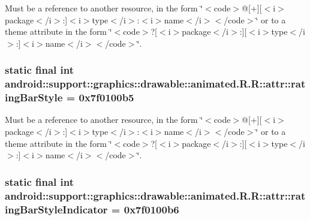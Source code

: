 Must be a reference to another resource, in the form \char`\"{}$<$code$>$@\mbox{[}+\mbox{]}\mbox{[}$<$i$>$package$<$/i$>$:\mbox{]}$<$i$>$type$<$/i$>$:$<$i$>$name$<$/i$>$$<$/code$>$\char`\"{} or to a theme attribute in the form \char`\"{}$<$code$>$?\mbox{[}$<$i$>$package$<$/i$>$:\mbox{]}\mbox{[}$<$i$>$type$<$/i$>$:\mbox{]}$<$i$>$name$<$/i$>$$<$/code$>$\char`\"{}. \hypertarget{classandroid_1_1support_1_1graphics_1_1drawable_1_1animated_1_1_r_1_1attr_a4ec69890716dd71ed80d775161e9faa}{
\subsubsection[{ratingBarStyle}]{\setlength{\rightskip}{0pt plus 5cm}static final int android::support::graphics::drawable::animated.R.R::attr::ratingBarStyle = 0x7f0100b5}}
\label{classandroid_1_1support_1_1graphics_1_1drawable_1_1animated_1_1_r_1_1attr_a4ec69890716dd71ed80d775161e9faa}


Must be a reference to another resource, in the form \char`\"{}$<$code$>$@\mbox{[}+\mbox{]}\mbox{[}$<$i$>$package$<$/i$>$:\mbox{]}$<$i$>$type$<$/i$>$:$<$i$>$name$<$/i$>$$<$/code$>$\char`\"{} or to a theme attribute in the form \char`\"{}$<$code$>$?\mbox{[}$<$i$>$package$<$/i$>$:\mbox{]}\mbox{[}$<$i$>$type$<$/i$>$:\mbox{]}$<$i$>$name$<$/i$>$$<$/code$>$\char`\"{}. \hypertarget{classandroid_1_1support_1_1graphics_1_1drawable_1_1animated_1_1_r_1_1attr_9be200b14a1da57db4b762d5dcb7c21e}{
\subsubsection[{ratingBarStyleIndicator}]{\setlength{\rightskip}{0pt plus 5cm}static final int android::support::graphics::drawable::animated.R.R::attr::ratingBarStyleIndicator = 0x7f0100b6}}
\label{classandroid_1_1support_1_1graphics_1_1drawable_1_1animated_1_1_r_1_1attr_9be200b14a1da57db4b762d5dcb7c21e}


